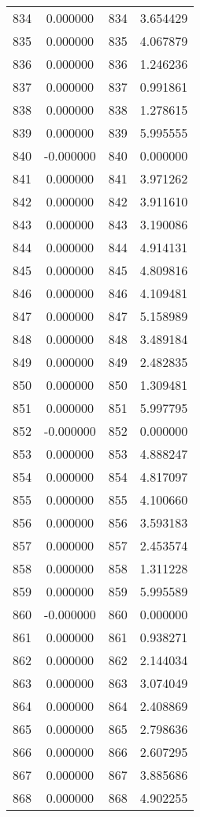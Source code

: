 \documentclass[12pt]{article}
\begin{document}
\begin{longtable}{@{}cccc@{}}
834 & 0.000000 & 834 & 3.654429 \\
835 & 0.000000 & 835 & 4.067879 \\
836 & 0.000000 & 836 & 1.246236 \\
837 & 0.000000 & 837 & 0.991861 \\
838 & 0.000000 & 838 & 1.278615 \\
839 & 0.000000 & 839 & 5.995555 \\
840 & -0.000000 & 840 & 0.000000 \\
841 & 0.000000 & 841 & 3.971262 \\
842 & 0.000000 & 842 & 3.911610 \\
843 & 0.000000 & 843 & 3.190086 \\
844 & 0.000000 & 844 & 4.914131 \\
845 & 0.000000 & 845 & 4.809816 \\
846 & 0.000000 & 846 & 4.109481 \\
847 & 0.000000 & 847 & 5.158989 \\
848 & 0.000000 & 848 & 3.489184 \\
849 & 0.000000 & 849 & 2.482835 \\
850 & 0.000000 & 850 & 1.309481 \\
851 & 0.000000 & 851 & 5.997795 \\
852 & -0.000000 & 852 & 0.000000 \\
853 & 0.000000 & 853 & 4.888247 \\
854 & 0.000000 & 854 & 4.817097 \\
855 & 0.000000 & 855 & 4.100660 \\
856 & 0.000000 & 856 & 3.593183 \\
857 & 0.000000 & 857 & 2.453574 \\
858 & 0.000000 & 858 & 1.311228 \\
859 & 0.000000 & 859 & 5.995589 \\
860 & -0.000000 & 860 & 0.000000 \\
861 & 0.000000 & 861 & 0.938271 \\
862 & 0.000000 & 862 & 2.144034 \\
863 & 0.000000 & 863 & 3.074049 \\
864 & 0.000000 & 864 & 2.408869 \\
865 & 0.000000 & 865 & 2.798636 \\
866 & 0.000000 & 866 & 2.607295 \\
867 & 0.000000 & 867 & 3.885686 \\
868 & 0.000000 & 868 & 4.902255 \\

\end{longtable}
\end{document}
